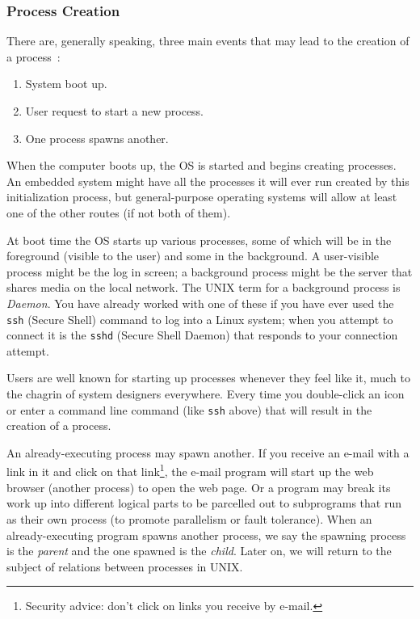 \documentclass[a4paper]{report}
\begin{document}
\subsubsection*{Process Creation}
There are, generally speaking, three main events that may lead to the creation of a process~\cite{mos}:

\begin{enumerate}
	\item System boot up.
	\item User request to start a new process.
	\item One process spawns another.
\end{enumerate}

When the computer boots up, the OS is started and begins creating processes. An embedded system might have all the processes it will ever run created by this initialization process, but general-purpose operating systems will allow at least one of the other routes (if not both of them).

At boot time the OS starts up various processes, some of which will be in the foreground (visible to the user) and some in the background. A user-visible process might be the log in screen; a background process might be the server that shares media on the local network. The UNIX term for a background process is \textit{Daemon}. You have already worked with one of these if you have ever used the \texttt{ssh} (Secure Shell) command to log into a Linux system; when you attempt to connect it is the \texttt{sshd} (Secure Shell Daemon) that responds to your connection attempt.

Users are well known for starting up processes whenever they feel like it, much to the chagrin of system designers everywhere. Every time you double-click an icon or enter a command line command (like \texttt{ssh} above) that will result in the creation of a process.

An already-executing process may spawn another. If you receive an e-mail with a link in it and click on that link\footnote{Security advice: don't click on links you receive by e-mail.}, the e-mail program will start up the web browser (another process) to open the web page. Or a program may break its work up into different logical parts to be parcelled out to subprograms that run as their own process (to promote parallelism or fault tolerance). When an already-executing program spawns another process, we say the spawning process is the \textit{parent} and the one spawned is the \textit{child}. Later on, we will return to the subject of relations between processes in UNIX.
\end{document}
